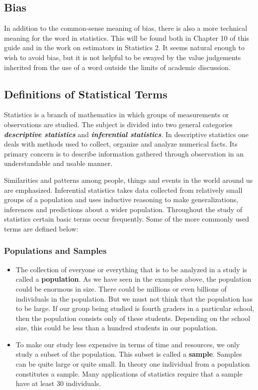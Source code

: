 ﻿\documentclass[]{report}
\begin{document}
\subsection{Bias}
In addition to the common-sense meaning of bias, there is also a more technical meaning for the
word in statistics. This will be found both in Chapter 10 of this guide and in the work on estimators
in Statistics 2. It seems natural enough to wish to avoid bias, but it is not helpful to be swayed by
the value judgements inherited from the use of a word outside the limits of academic discussion.


\subsection*{Definitions of Statistical Terms}

Statistics is a branch of mathematics in which groups of measurements or observations are studied. The subject is divided into two general categories \textit{\textbf{ descriptive statistics}} and \textit{\textbf{inferential statistics}}. In descriptive statistics one deals with methods used to collect, organize and analyze numerical facts. Its primary concern is to describe information gathered through observation in an understandable and usable manner. 

Similarities and patterns among people, things and events in the world around us are emphasized. Inferential statistics takes data collected from relatively small groups of a population and uses inductive reasoning to make generalizations, inferences and predictions about a wider population.
Throughout the study of statistics certain basic terms occur frequently. Some of the more commonly used terms are defined below:


\subsubsection*{Populations and Samples}
\begin{itemize}
\item The collection of everyone or everything that is to be analyzed in a study is called a \textbf{population}. As we have seen in the examples above, the population could be enormous in size. There could be millions or even billions of individuals in the population. But we must not think that the population has to be large. If our group being studied is fourth graders in a particular school, then the population consists only of these students. Depending on the school size, this could be less than a hundred students in our population.

\item 
To make our study less expensive in terms of time and resources, we only study a subset of the population. This subset is called a \textbf{sample}. Samples can be quite large or quite small. In theory one individual from a population constitutes a sample. Many applications of statistics require that a sample have at least 30 individuals.
\end{itemize}
\end{document}
